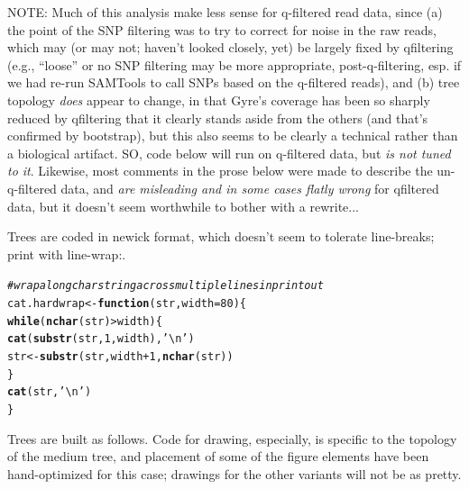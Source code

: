 \documentclass{article}\usepackage[]{graphicx}\usepackage[]{color}
\makeatletter
\newcommand{\hlnum}[1]{\textcolor[rgb]{0.686,0.059,0.569}{#1}}%
\newcommand{\hlstr}[1]{\textcolor[rgb]{0.192,0.494,0.8}{#1}}%
\newcommand{\hlcom}[1]{\textcolor[rgb]{0.678,0.584,0.686}{\textit{#1}}}%
\newcommand{\hlopt}[1]{\textcolor[rgb]{0,0,0}{#1}}%
\newcommand{\hlstd}[1]{\textcolor[rgb]{0.345,0.345,0.345}{#1}}%
\newcommand{\hlkwa}[1]{\textcolor[rgb]{0.161,0.373,0.58}{\textbf{#1}}}%
\newcommand{\hlkwb}[1]{\textcolor[rgb]{0.69,0.353,0.396}{#1}}%
\newcommand{\hlkwc}[1]{\textcolor[rgb]{0.333,0.667,0.333}{#1}}%
\newcommand{\hlkwd}[1]{\textcolor[rgb]{0.737,0.353,0.396}{\textbf{#1}}}%
\newenvironment{kframe}{%
 \def\at@end@of@kframe{}%
 \ifinner\ifhmode%
  \def\at@end@of@kframe{\end{minipage}}%
  \begin{minipage}{\columnwidth}%
 \fi\fi%
 \def\FrameCommand##1{\hskip\@totalleftmargin \hskip-\fboxsep
 \colorbox{shadecolor}{##1}\hskip-\fboxsep
     \hskip-\linewidth \hskip-\@totalleftmargin \hskip\columnwidth}%
 \MakeFramed {\advance\hsize-\width
   \@totalleftmargin\z@ \linewidth\hsize
   \@setminipage}}%
 {\par\unskip\endMakeFramed%
 \at@end@of@kframe}
\newenvironment{knitrout}{}{} %
\makeatother
\begin{document}
NOTE: Much of this analysis make less sense for q-filtered read data, since (a) the point of the SNP 
filtering was to try to correct for noise in the raw reads, which may (or may not; haven't looked 
closely, yet) be largely fixed by qfiltering
(e.g., ``loose'' or no SNP filtering may be more appropriate, post-q-filtering, esp. if we had 
re-run SAMTools to call SNPs based on the q-filtered reads), and 
(b) tree topology \emph{does} appear to change, in that Gyre's coverage has been so sharply reduced 
by qfiltering that it clearly stands aside from the others (and that's confirmed by bootstrap), but 
this also seems to be clearly a technical rather than a biological artifact.  SO, code below will 
run on q-filtered data, but \emph{is not tuned to it}.  Likewise, most comments in the prose below were 
made to describe the un-q-filtered data, and \emph{are misleading and in some cases flatly wrong} for 
qfiltered data, but it doesn't seem worthwhile to bother with a rewrite...

Trees are coded in newick format, which doesn't seem to tolerate line-breaks; print with line-wrap:.

\begin{knitrout}\footnotesize
{}\color{fgcolor}\begin{kframe}
\begin{alltt}
\hlcom{# wrap a long char string across multiple lines in printout}
\hlstd{cat.hardwrap} \hlkwb{<-} \hlkwa{function}\hlstd{(}\hlkwc{str}\hlstd{,}\hlkwc{width}\hlstd{=}\hlnum{80}\hlstd{)\{}
  \hlkwa{while}\hlstd{(}\hlkwd{nchar}\hlstd{(str)}\hlopt{>}\hlstd{width)\{}
    \hlkwd{cat}\hlstd{(}\hlkwd{substr}\hlstd{(str,}\hlnum{1}\hlstd{,width),}\hlstr{'\textbackslash{}n'}\hlstd{)}
    \hlstd{str} \hlkwb{<-} \hlkwd{substr}\hlstd{(str,width}\hlopt{+}\hlnum{1}\hlstd{,}\hlkwd{nchar}\hlstd{(str))}
  \hlstd{\}}
  \hlkwd{cat}\hlstd{(str,}\hlstr{'\textbackslash{}n'}\hlstd{)}
\hlstd{\}}
\end{alltt}
\end{kframe}
\end{knitrout}


Trees are built as follows.   Code for drawing, especially, is specific to the topology of the medium tree, and placement of some of the figure elements have been hand-optimized for this case; drawings for the other variants will not be as pretty.
\end{document}
